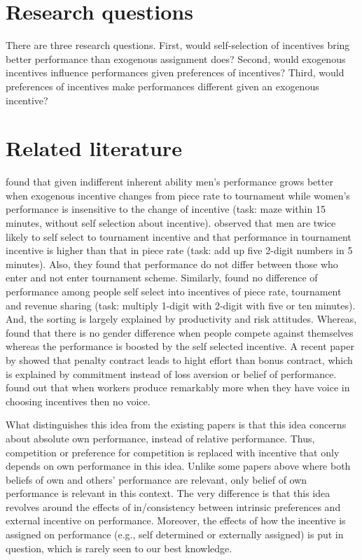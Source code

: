 \documentclass[12pt]{article}
\begin{document}
\section{Research questions}

There are three research questions. First, would self-selection of incentives bring better performance than exogenous assignment does?  Second, would exogenous incentives influence performances given preferences of incentives? Third, would preferences of incentives make performances different given an exogenous incentive?

\section{Related literature}

\citet{Gneezy2003} found that given indifferent inherent ability men's performance grows better when exogenous incentive changes from piece rate to tournament while women's performance is insensitive to the change of incentive (task: maze within 15 minutes, without self selection about incentive). \citet{Niederle2007} observed that men are twice likely to self select to tournament incentive and that performance in tournament incentive is higher than that in piece rate (task: add up five 2-digit numbers in 5 minutes). Also, they found that performance do not differ between those who enter and not enter tournament scheme. Similarly, \citet{Dohmen2011a} found no difference of performance among people self select into incentives of piece rate, tournament and revenue sharing (task: multiply 1-digit with 2-digit with five or ten minutes). And, the sorting is largely explained by productivity and risk attitudes. Whereas, \citet{Apicella2017} found that there is no gender difference when people compete against themselves whereas the performance is boosted by the self selected incentive. A recent paper by \citep{Quidt2017} showed that penalty contract leads to hight effort than bonus contract, which is explained by commitment instead of loss aversion or belief of performance. \citet{Mellizo2017} found out that when workers produce remarkably more when they have voice in choosing incentives then no voice. 

What distinguishes this idea from the existing papers is that this idea concerns about absolute own performance, instead of relative performance. Thus, competition or preference for competition is replaced with incentive that only depends on own performance in this idea. Unlike some papers above where both beliefs of own and others' performance are relevant, only belief of own performance is relevant in this context. The very difference is that this idea revolves around the effects of in/consistency between intrinsic preferences and external incentive on performance. Moreover, the effects of how the incentive is assigned on performance (e.g., self determined or externally assigned) is put in question, which is rarely seen to our best knowledge.
\end{document}
